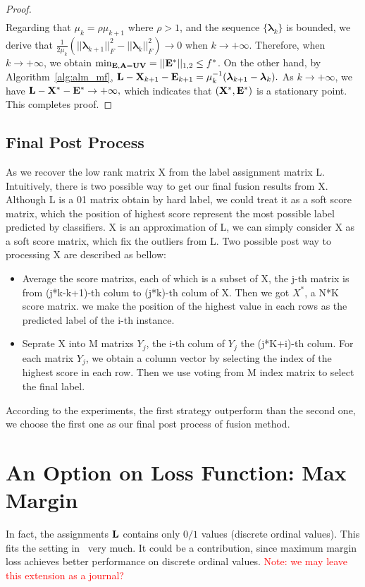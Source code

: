 \documentclass[letterpaper]{article}
\def\bE{{\bf E}}
\def\blambda{{\bm \lambda}}
\def\bL{{\bf L}}
\def\bU{{\bf U}}
\def\bV{{\bf V}}
\def\bX{{\bf X}}
\def\bA{{\bf A}}
\def\bX{{\bf X}}
\def\yanred{\textcolor{red}}
\begin{document}
\begin{proof}
\begin{align}
    \end{align}
    \indent
    Regarding that $\mu_{k} = \rho \mu_{k+1}$ where $\rho > 1$, and the sequence $\{ \blambda_k \}$ is bounded, we derive that
    $\frac{1}{2\mu_k} (|| \blambda_{k+1} ||_F^2 - || \blambda_{k} ||_F^2) \rightarrow 0$ when $k \rightarrow +\infty .$
    Therefore, when $k \rightarrow +\infty$, we obtain $\min_{\bE, \bA = \bU \bV} = || \bE^* ||_{1,2} \leq f^*$.
    On the other hand, by Algorithm~\ref{alg:alm_mf}, $\bL - \bX_{k+1} - \bE_{k+1} = \mu_k^{-1} (\blambda_{k+1} - \blambda_{k}) .$
    As $k \rightarrow +\infty$, we have $\bL - \bX^* - \bE^* \rightarrow +\infty  ,$
    which indicates that $(\bX^*, \bE^*)$ is a stationary point.
    This completes proof.
\end{proof}




\subsection{Final Post Process}
As we recover the low rank matrix X from the label assignment matrix L. Intuitively, there is two possible way to get our final fusion results from X. Although L is a 01 matrix obtain by hard label, we could treat it as a soft score matrix, which the position of highest score represent the most possible label predicted by classifiers. X is an approximation of L, we can simply consider X as a soft score matrix, which fix the outliers from L. Two possible post way to processing X are described as bellow:
\begin{itemize}
  \item Average the score matrixs, each of which is a subset of X, the j-th matrix is from (j*k-k+1)-th colum to (j*k)-th colum of X. Then we got $X^*$, a N*K score matrix. we make the position of the highest value in each rows as the predicted label of the i-th instance.
  \item Seprate X into M matrixs $Y_j$, the i-th colum of $Y_j$ the (j*K+i)-th colum. For each matrix $Y_j$, we obtain a column vector by selecting the index of the highest score in each row. Then we use voting from M index matrix to select the final label.
\end{itemize}
According to the experiments, the first strategy outperform than the second one, we choose the first one as our final post process of fusion method.

\iffalse
\section{An Option on Loss Function: Max Margin}
In fact, the assignments $\bL$ contains only $0/1$ values (discrete ordinal values).
This fits the setting in~\cite{yanijcai2015scalable} very much.
It could be a contribution, since maximum margin loss achieves better performance on discrete ordinal values.
\yanred{Note: we may leave this extension as a journal?}
\end{document}
